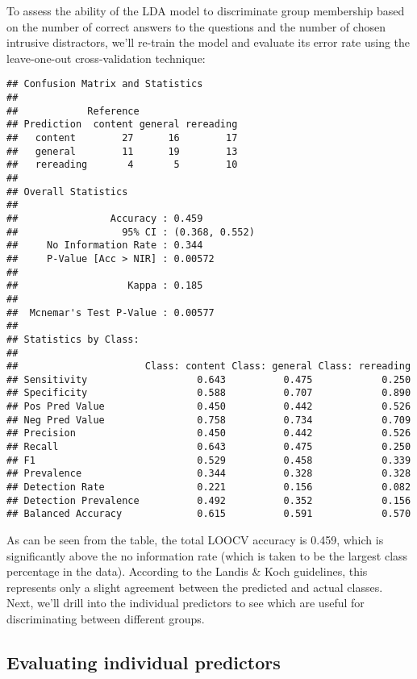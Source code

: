 \documentclass[11pt,]{article}
\begin{document}
To assess the ability of the LDA model to discriminate group membership
based on the number of correct answers to the questions and the number
of chosen intrusive distractors, we'll re-train the model and evaluate
its error rate using the leave-one-out cross-validation technique:

\begin{verbatim}
## Confusion Matrix and Statistics
## 
##            Reference
## Prediction  content general rereading
##   content        27      16        17
##   general        11      19        13
##   rereading       4       5        10
## 
## Overall Statistics
##                                         
##                Accuracy : 0.459         
##                  95% CI : (0.368, 0.552)
##     No Information Rate : 0.344         
##     P-Value [Acc > NIR] : 0.00572       
##                                         
##                   Kappa : 0.185         
##                                         
##  Mcnemar's Test P-Value : 0.00577       
## 
## Statistics by Class:
## 
##                      Class: content Class: general Class: rereading
## Sensitivity                   0.643          0.475            0.250
## Specificity                   0.588          0.707            0.890
## Pos Pred Value                0.450          0.442            0.526
## Neg Pred Value                0.758          0.734            0.709
## Precision                     0.450          0.442            0.526
## Recall                        0.643          0.475            0.250
## F1                            0.529          0.458            0.339
## Prevalence                    0.344          0.328            0.328
## Detection Rate                0.221          0.156            0.082
## Detection Prevalence          0.492          0.352            0.156
## Balanced Accuracy             0.615          0.591            0.570
\end{verbatim}

As can be seen from the table, the total LOOCV accuracy is 0.459, which
is significantly above the no information rate (which is taken to be the
largest class percentage in the data). According to the Landis \& Koch
\citep[1977; as reported in][]{salkindEncyclopediaMeasurementStatistics2007}
guidelines, this represents only a slight agreement between the
predicted and actual classes. Next, we'll drill into the individual
predictors to see which are useful for discriminating between different
groups.

\hypertarget{evaluating-individual-predictors}{%
\subsection{Evaluating individual
predictors}\label{evaluating-individual-predictors}}
\end{document}
